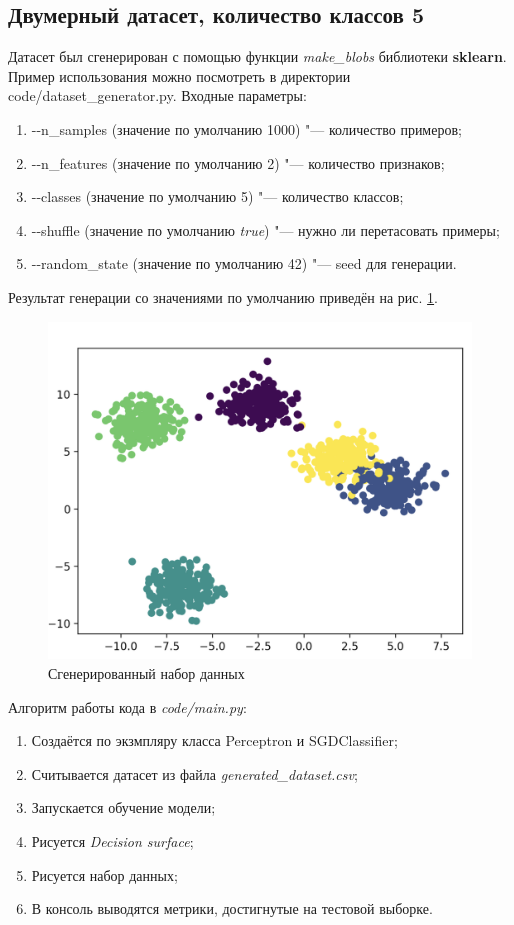 \subsection{Двумерный датасет, количество классов 5}
Датасет был сгенерирован с помощью функции \textit{make\_blobs} библиотеки \textbf{sklearn}. Пример использования можно посмотреть в директории code/dataset\_generator.py. Входные параметры:
\begin{enumerate}
	\item -{}-n\_samples (значение по умолчанию 1000) "--- количество примеров;
	\item -{}-n\_features (значение по умолчанию 2) "--- количество признаков;
	\item -{}-classes (значение по умолчанию 5) "--- количество классов;
	\item -{}-shuffle (значение по умолчанию \textit{true}) "--- нужно ли перетасовать примеры;
	\item -{}-random\_state (значение по умолчанию 42) "--- seed для генерации.
\end{enumerate}
Результат генерации со значениями по умолчанию приведён на рис. \ref{img:blobs}.
\begin{figure}[h]
	\centering
	\includegraphics[width=0.8\linewidth]{images/blobs}
	\caption{Сгенерированный набор данных}
	\label{img:blobs}
\end{figure}

Алгоритм работы кода в \textit{code/main.py}:
\begin{enumerate}
	\item Создаётся по экзмпляру класса Perceptron и SGDClassifier;
	\item Считывается датасет из файла \textit{generated\_dataset.csv};
	\item Запускается обучение модели;
	\item Рисуется \textit{Decision surface};
	\item Рисуется набор данных;
	\item В консоль выводятся метрики, достигнутые на тестовой выборке.
\end{enumerate}


